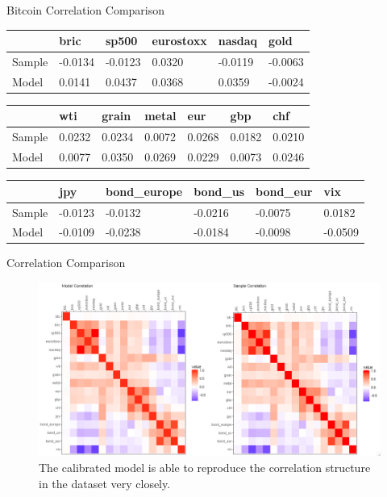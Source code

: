 \documentclass{beamer}
\newcommand\SmallerFont{\fontsize{8}{10}\selectfont}
\begin{document}
\begin{frame}{Bitcoin Correlation Comparison}
\SmallerFont
\begin{table}[]
\begin{tabular}{llllll}
\toprule
 & bric & sp500 & eurostoxx & nasdaq & gold \\
 \midrule
Sample & -0.0134 & -0.0123 & 0.0320 & -0.0119 & -0.0063 \\
Model & 0.0141 & 0.0437 & 0.0368 & 0.0359 & -0.0024 \\
\bottomrule
\end{tabular}
\end{table}

\begin{table}[]
\begin{tabular}{lllllll}
\toprule
 & wti & grain & metal & eur & gbp & chf \\
 \midrule
Sample & 0.0232 & 0.0234 & 0.0072 & 0.0268 & 0.0182 & 0.0210 \\
Model & 0.0077 & 0.0350 & 0.0269 & 0.0229 & 0.0073 & 0.0246 \\
\bottomrule
\end{tabular}
\end{table}

\begin{table}[]
\begin{tabular}{llllll}
\toprule
 & jpy & bond\_europe & bond\_us & bond\_eur & vix \\
 \midrule
Sample & -0.0123 & -0.0132 & -0.0216 & -0.0075 & 0.0182 \\
Model & -0.0109 & -0.0238 & -0.0184 & -0.0098 & -0.0509 \\
\bottomrule
\end{tabular}
\end{table}

\end{frame}


\begin{frame}{Correlation Comparison}
\begin{figure}
\includegraphics[width=\textwidth]{correlation_comparison}
\caption{The calibrated model is able to reproduce the correlation structure in the dataset very closely.}
\end{figure}
\end{frame}
\end{document}
